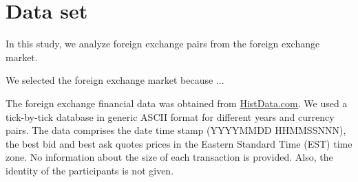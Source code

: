 \section{Data set}\label{sec:data_set}

In this study, we analyze foreign exchange pairs from the foreign exchange market.

We selected the foreign exchange market because ...

The foreign exchange financial data was obtained from
\href{www.histdata.com}{HistData.com}. We used a tick-by-tick database in generic ASCII
format for different years and currency pairs. The data comprises the date time
stamp (YYYYMMDD HHMMSSNNN),
the best bid and best ask quotes prices in the Eastern Standard Time (EST) time zone.
No information about the size of each transaction is provided. Also, the
identity of the participants is not given.


